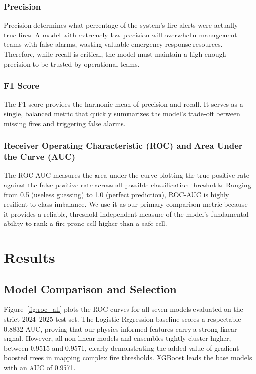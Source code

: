 \subsubsection{Precision}

Precision determines what percentage of the system's fire alerts were actually true fires. A model with extremely low precision will overwhelm management teams with false alarms, wasting valuable emergency response resources. Therefore, while recall is critical, the model must maintain a high enough precision to be trusted by operational teams.

\subsubsection{F1 Score}

The F1 score provides the harmonic mean of precision and recall. It serves as a single, balanced metric that quickly summarizes the model's trade-off between missing fires and triggering false alarms.

\subsubsection{Receiver Operating Characteristic (ROC) and Area Under the Curve (AUC)}

The ROC-AUC measures the area under the curve plotting the true-positive rate against the false-positive rate across all possible classification thresholds. Ranging from 0.5 (useless guessing) to 1.0 (perfect prediction), ROC-AUC is highly resilient to class imbalance. We use it as our primary comparison metric because it provides a reliable, threshold-independent measure of the model's fundamental ability to rank a fire-prone cell higher than a safe cell.

\section{Results}

\subsection{Model Comparison and Selection}

Figure~\ref{fig:roc_all} plots the ROC curves for all seven models evaluated on the strict 2024--2025 test set. The Logistic Regression baseline scores a respectable 0.8832 AUC, proving that our physics-informed features carry a strong linear signal. However, all non-linear models and ensembles tightly cluster higher, between 0.9515 and 0.9571, clearly demonstrating the added value of gradient-boosted trees in mapping complex fire thresholds. XGBoost leads the base models with an AUC of 0.9571.

